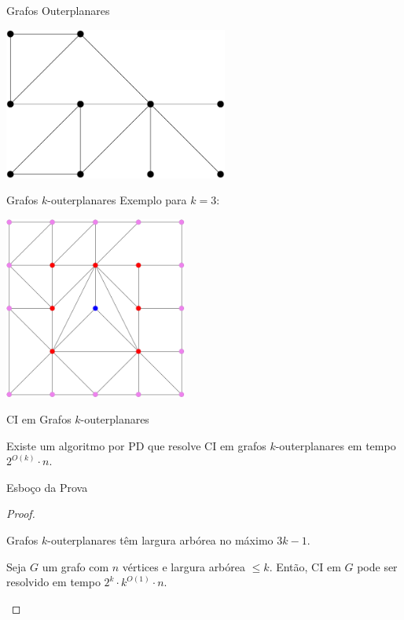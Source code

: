 \begin{frame}{Grafos Outerplanares}
    \begin{minipage}{\linewidth}
        \centering
        \includegraphics[height=5cm]{images/outerplanar.png}
    \end{minipage}
\end{frame}

\begin{frame}{Grafos $k$-outerplanares}
    \centering
    \Large Exemplo para $k=3$:
    \bigbreak
    \begin{minipage}{\linewidth}
        \centering
        \includegraphics[height=6cm]{images/k-outer.png}
    \end{minipage}
\end{frame}

\begin{frame}{CI em Grafos $k$-outerplanares}
    \begin{lema}[1] \label{lema1}
        Existe um algoritmo por PD que resolve CI em grafos $k$-outerplanares em tempo $2^{O(k)} \cdot n$.
    \end{lema}
\end{frame}

\begin{frame}{Esboço da Prova}
    \begin{proof}
        \begin{lema}
            Grafos $k$-outerplanares têm largura arbórea no máximo $3k - 1$.
        \end{lema}
        \bigbreak
        \begin{lema}
            Seja $G$ um grafo com $n$ vértices e largura arbórea $\leq k$. Então, CI em $G$ pode ser resolvido em tempo $2^k \cdot k^{O(1)} \cdot n$.
        \end{lema}
    \end{proof}
\end{frame}
